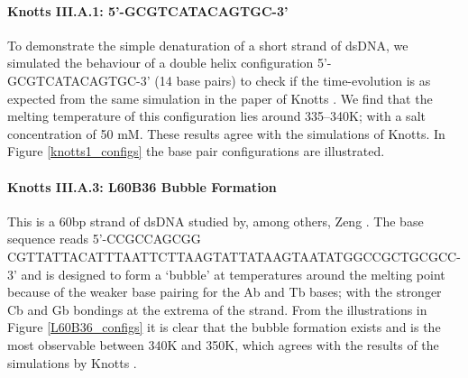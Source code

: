 \paragraph{Knotts III.A.1: 5'-GCGTCATACAGTGC-3'} To demonstrate the simple denaturation of a short strand of dsDNA, we simulated the behaviour of a double helix configuration 5'-GCGTCATACAGTGC-3' (14 base pairs) to check if the time-evolution is as expected from the same simulation in the paper of Knotts \etal \cite{knotts2007coarse}.
We find that the melting temperature of this configuration lies around 335--340K; with a salt concentration of 50 mM.
These results agree with the simulations of Knotts. In Figure \ref{knotts1_configs} the base pair configurations are illustrated.



\paragraph{Knotts III.A.3: L60B36 Bubble Formation} This is a 60bp strand of dsDNA studied by, among others, Zeng \etal \cite{zeng2003length}.
The base sequence reads 5'-CCGCCAGCGG CGTTATTACATTTAATTCTTAAGTATTATAAGTAATATGGCCGCTGCGCC-3' and is designed to form a `bubble' at temperatures around the melting point because of the weaker base pairing for the Ab and Tb bases; with the stronger Cb and Gb bondings at the extrema of the strand.
From the illustrations in Figure \ref{L60B36_configs} it is clear that the bubble formation exists and is the most observable between 340K and 350K, which agrees with the results of the simulations by Knotts \etal \cite{knotts2007coarse}.


